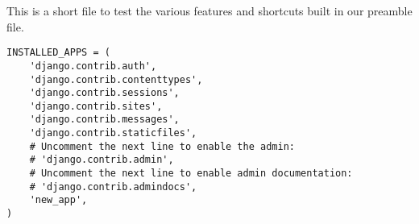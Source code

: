 





This is a short file to test the various features and shortcuts built in our preamble file.

\begin{verbatim}
INSTALLED_APPS = (
    'django.contrib.auth',
    'django.contrib.contenttypes',
    'django.contrib.sessions',
    'django.contrib.sites',
    'django.contrib.messages',
    'django.contrib.staticfiles',
    # Uncomment the next line to enable the admin:
    # 'django.contrib.admin',
    # Uncomment the next line to enable admin documentation:
    # 'django.contrib.admindocs',
    'new_app',
)
\end{verbatim}


